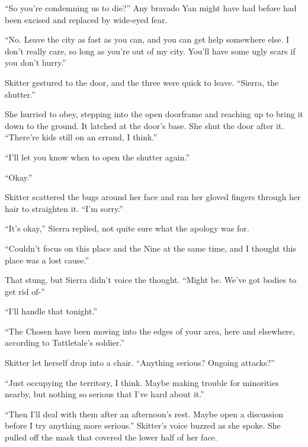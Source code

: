 ``So you're condemning us to die?''  Any bravado Yan might have had before had been excised and replaced by wide-eyed fear.



``No.  Leave the city as fast as you can, and you can get help somewhere else.  I don't really care, so long as you're out of my city.  You'll have some ugly scars if you don't hurry.''



Skitter gestured to the door, and the three were quick to leave.  ``Sierra, the shutter.''



She hurried to obey, stepping into the open doorframe and reaching up to bring it down to the ground.  It latched at the door's base.  She shut the door after it.  ``There're kids still on an errand, I think.''



``I'll let you know when to open the shutter again.''



``Okay.''



Skitter scattered the bugs around her face and ran her gloved fingers through her hair to straighten it.  ``I'm sorry.''



``It's okay,'' Sierra replied, not quite sure what the apology was for.



``Couldn't focus on this place and the Nine at the same time, and I thought this place was a lost cause.''



That stung, but Sierra didn't voice the thought.  ``Might be.  We've got bodies to get rid of-''



``I'll handle that tonight.''



``The Chosen have been moving into the edges of your area, here and elsewhere, according to Tattletale's soldier.''



Skitter let herself drop into a chair.  ``Anything serious?  Ongoing attacks?''



``Just occupying the territory, I think.  Maybe making trouble for minorities nearby, but nothing so serious that I've hard about it.''



``Then I'll deal with them after an afternoon's rest.  Maybe open a discussion before I try anything more serious.''  Skitter's voice buzzed as she spoke.  She pulled off the mask that covered the lower half of her face.



